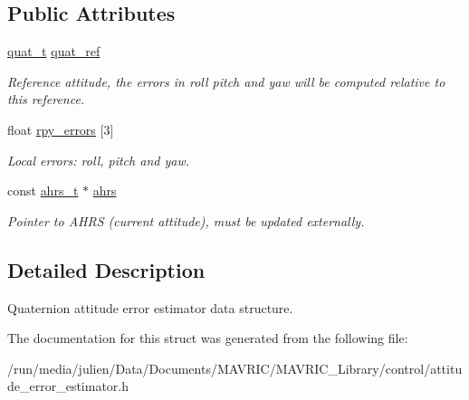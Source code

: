 \subsection*{Public Attributes}
\begin{DoxyCompactItemize}
\item 
\hypertarget{structattitude__error__estimator__t_a168881f366d25f951c9d5825ed417811}{\hyperlink{structquat__t}{quat\+\_\+t} \hyperlink{structattitude__error__estimator__t_a168881f366d25f951c9d5825ed417811}{quat\+\_\+ref}}\label{structattitude__error__estimator__t_a168881f366d25f951c9d5825ed417811}

\begin{DoxyCompactList}\small\item\em Reference attitude, the errors in roll pitch and yaw will be computed relative to this reference. \end{DoxyCompactList}\item 
\hypertarget{structattitude__error__estimator__t_aa7b99f9a229355fd2cfacdb7432f278e}{float \hyperlink{structattitude__error__estimator__t_aa7b99f9a229355fd2cfacdb7432f278e}{rpy\+\_\+errors} \mbox{[}3\mbox{]}}\label{structattitude__error__estimator__t_aa7b99f9a229355fd2cfacdb7432f278e}

\begin{DoxyCompactList}\small\item\em Local errors\+: roll, pitch and yaw. \end{DoxyCompactList}\item 
\hypertarget{structattitude__error__estimator__t_abdb541e4bf6dacd727de5d171e0063ca}{const \hyperlink{structahrs__t}{ahrs\+\_\+t} $\ast$ \hyperlink{structattitude__error__estimator__t_abdb541e4bf6dacd727de5d171e0063ca}{ahrs}}\label{structattitude__error__estimator__t_abdb541e4bf6dacd727de5d171e0063ca}

\begin{DoxyCompactList}\small\item\em Pointer to A\+H\+R\+S (current attitude), must be updated externally. \end{DoxyCompactList}\end{DoxyCompactItemize}


\subsection{Detailed Description}
Quaternion attitude error estimator data structure. 

The documentation for this struct was generated from the following file\+:\begin{DoxyCompactItemize}
\item 
/run/media/julien/\+Data/\+Documents/\+M\+A\+V\+R\+I\+C/\+M\+A\+V\+R\+I\+C\+\_\+\+Library/control/attitude\+\_\+error\+\_\+estimator.\+h\end{DoxyCompactItemize}
